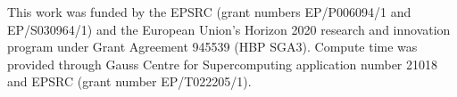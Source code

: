 \documentclass[sigconf,authordraft]{acmart}
\begin{document}
\begin{acks}
This work was funded by the EPSRC (grant numbers EP/P006094/1 and EP/S030964/1) and the European Union's Horizon 2020 research and innovation program under Grant Agreement 945539 (HBP SGA3).
Compute time was provided through Gauss Centre for Supercomputing application number 21018 and EPSRC (grant number EP/T022205/1).
\end{acks}



\end{document}
